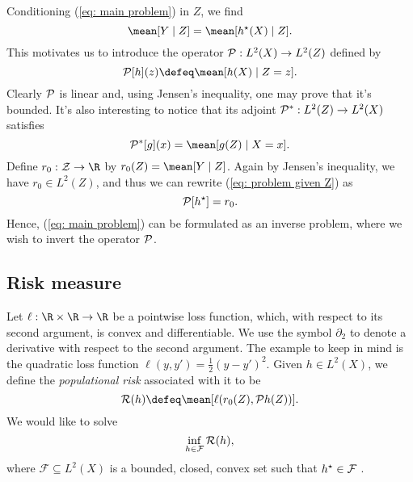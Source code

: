 Conditioning (\ref{eq: main problem}) in $ Z $, we find
\begin{equation}
    \label{eq: problem given Z}
    \mean [ Y \mid Z ] = \mean [ \hstar ( X ) \mid Z ]
.\end{equation}
This motivates us to introduce the operator $ \mathcal{P} : L^{ 2 } ( X ) \to L^{ 2 } ( Z ) $ defined by
\begin{equation*}
    \meanop [ h ] ( z ) \defeq \mean [ h ( X ) \mid Z = z ]
.\end{equation*}
Clearly $ \mathcal{P} $ is linear and, using Jensen's inequality, one may prove that it's bounded.
It's also interesting to notice that its adjoint $ \mathcal{P}^{ * } : L^{ 2 } ( Z ) \to L^{ 2 } ( X ) $ satisfies
\begin{equation}
    \label{eq: T adjoint}
    \meanop^{ * } [ g ] ( x ) = \mean [ g ( Z ) \mid X = x ].
\end{equation}
Define $ r_{ 0 } : \mathcal{Z} \to \R $ by $ r_{ 0 } ( Z ) = \mean [ Y \mid Z ] $.
Again by Jensen's inequality, we have $ r_{ 0 } \in L^{ 2 } ( Z ) $, and thus we can rewrite (\ref{eq: problem given Z}) as
\begin{equation}
    \label{eq: problem with T}
    \mathcal{P} [ h^{ \star } ] = r_{ 0 }
.\end{equation}
Hence, (\ref{eq: main problem}) can be formulated as an inverse problem, where we wish to invert the operator $ \mathcal{P} $.

\subsection{Risk measure}

Let $ \ell : \R \times \R \to \R $ be a pointwise loss function, which, with respect to its second argument, is convex and differentiable.
We use the symbol $ \partial_{ 2 } $ to denote a derivative with respect to the second argument.
The example to keep in mind is the quadratic loss function $ \ell ( y, y' ) = \frac{ 1 }{ 2 } ( y - y' )^2 $.
Given $ h \in L^{ 2 } ( X ) $, we define the \emph{populational risk} associated with it to be
\begin{equation*}
    \risk ( h ) \defeq \mean [ \ell ( r_{ 0 } ( Z ), \meanop h ( Z ) ) ]
.\end{equation*}
We would like to solve
\begin{equation*}
    \inf_{ h \in \mathcal{F} } \mathcal{R} ( h )
,\end{equation*}
where $ \mathcal{F} \subseteq L^{ 2 } ( X ) $ is a bounded, closed, convex set such that $ h^{ \star } \in \mathcal{F} $ .

